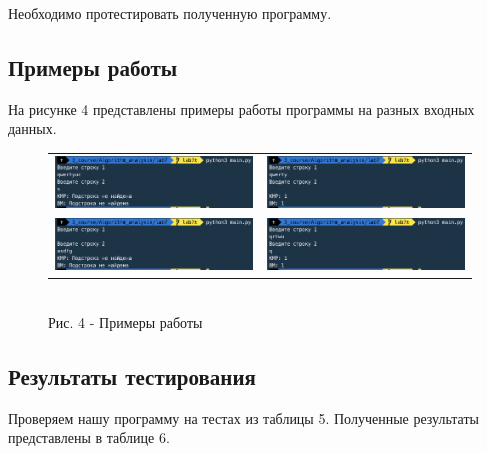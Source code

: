 \documentclass[a4paper,14pt]{article} %
\begin{document}
        Необходимо протестировать полученную программу. 

        \subsection{Примеры работы}
	\hfill
	
	На рисунке 4 представлены примеры работы программы на разных входных данных.
	\begin{figure}[ht]\center
		\begin{tabular}{cc}
			\includegraphics[width=80mm]{ex1} & \includegraphics[width=80mm]{ex2} \\
			\includegraphics[width=80mm]{ex3} & \includegraphics[width=80mm]{ex4}
		\end{tabular}
		\\ Рис. 4 - Примеры работы
	\end{figure}
	
	 \subsection{Результаты тестирования}
        
	\hfill
	Проверяем нашу программу на тестах из таблицы 5. Полученные результаты представлены в таблице 6. 
	
\end{document}

